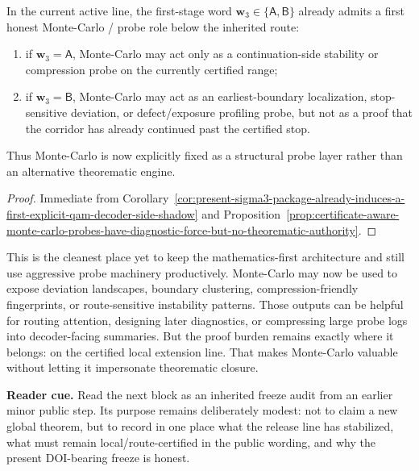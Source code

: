 \begin{corollary}
\label{cor:present-sigma3-package-already-admits-a-first-honest-monte-carlo-role}
In the current active line, the first-stage word \(\mathbf w_3\in\{\mathsf A,\mathsf B\}\) already admits a first honest Monte-Carlo / probe role below the inherited route:
\begin{enumerate}[label=(\roman*)]
  \item if \(\mathbf w_3=\mathsf A\), Monte-Carlo may act only as a continuation-side stability or compression probe on the currently certified range;
  \item if \(\mathbf w_3=\mathsf B\), Monte-Carlo may act as an earliest-boundary localization, stop-sensitive deviation, or defect/exposure profiling probe, but not as a proof that the corridor has already continued past the certified stop.
\end{enumerate}
Thus Monte-Carlo is now explicitly fixed as a structural probe layer rather than an alternative theorematic engine.
\end{corollary}

\begin{proof}
Immediate from Corollary~\ref{cor:present-sigma3-package-already-induces-a-first-explicit-qam-decoder-side-shadow} and Proposition~\ref{prop:certificate-aware-monte-carlo-probes-have-diagnostic-force-but-no-theorematic-authority}.
\end{proof}

\begin{remark}
\label{rem:what-this-monte-carlo-probe-discipline-now-buys}
This is the cleanest place yet to keep the mathematics-first architecture and still use aggressive probe machinery productively. Monte-Carlo may now be used to expose deviation landscapes, boundary clustering, compression-friendly fingerprints, or route-sensitive instability patterns. Those outputs can be helpful for routing attention, designing later diagnostics, or compressing large probe logs into decoder-facing summaries. But the proof burden remains exactly where it belongs: on the certified local extension line. That makes Monte-Carlo valuable without letting it impersonate theorematic closure.
\end{remark}


\noindent\textbf{Reader cue.} Read the next block as an inherited freeze audit from an earlier minor public step. Its purpose remains deliberately modest: not to claim a new global theorem, but to record in one place what the release line has stabilized, what must remain local/route-certified in the public wording, and why the present DOI-bearing freeze is honest.

